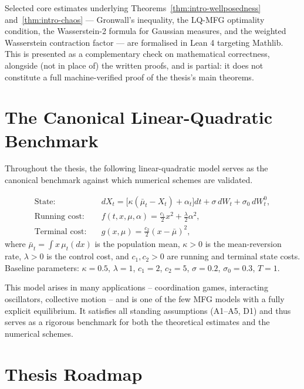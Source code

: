 \begin{proposition}
\label{prop:intro-lean}
Selected core estimates underlying Theorems~\ref{thm:intro-wellposedness}
and~\ref{thm:intro-chaos} --- Gronwall's inequality, the LQ-MFG optimality
condition, the Wasserstein-2 formula for Gaussian measures, and the weighted
Wasserstein contraction factor --- are formalised in Lean 4 targeting Mathlib.
This is presented as a complementary check on mathematical correctness,
alongside (not in place of) the written proofs, and is partial: it does not
constitute a full machine-verified proof of the thesis's main theorems.
\end{proposition}

\section{The Canonical Linear-Quadratic Benchmark}

Throughout the thesis, the following linear-quadratic model serves as the canonical
benchmark against which numerical schemes are validated.

\begin{example}
\label{ex:lq-mfg}
\begin{align*}
    \text{State:} & \quad dX_t = \big[\kappa(\bar\mu_t - X_t) + \alpha_t\big] dt
        + \sigma\, dW_t + \sigma_0\, dW_t^0, \\
    \text{Running cost:} & \quad f(t,x,\mu,\alpha) = \tfrac{c_1}{2}x^2 +
        \tfrac{\lambda}{2}\alpha^2, \\
    \text{Terminal cost:} & \quad g(x,\mu) = \tfrac{c_2}{2}(x-\bar\mu)^2,
\end{align*}
where $\bar\mu_t = \int x\, \mu_t(dx)$ is the population mean, $\kappa > 0$ is
the mean-reversion rate, $\lambda > 0$ is the control cost, and $c_1, c_2 > 0$
are running and terminal state costs. Baseline parameters: $\kappa=0.5$,
$\lambda=1$, $c_1=2$, $c_2=5$, $\sigma=0.2$, $\sigma_0=0.3$, $T=1$.
\end{example}

This model arises in many applications -- coordination games, interacting oscillators,
collective motion -- and is one of the few MFG models with a fully explicit
equilibrium. It satisfies all standing assumptions (A1--A5, D1) and thus serves as
a rigorous benchmark for both the theoretical estimates and the numerical schemes.

\section{Thesis Roadmap}

